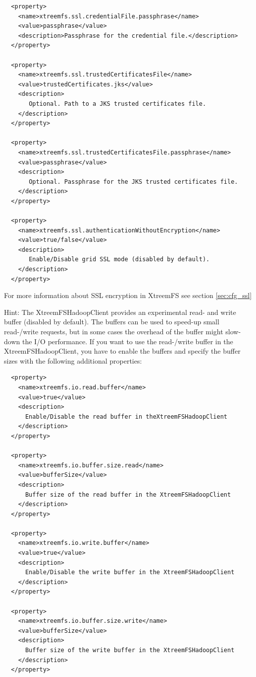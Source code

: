 \documentclass[a4paper,10pt]{book}
\begin{document}
\begin{enumerate}
\begin{enumerate}
\begin{verbatim}
  <property>
    <name>xtreemfs.ssl.credentialFile.passphrase</name>
    <value>passphrase</value>
    <description>Passphrase for the credential file.</description>
  </property>

  <property>
    <name>xtreemfs.ssl.trustedCertificatesFile</name>
    <value>trustedCertificates.jks</value>
    <description>
       Optional. Path to a JKS trusted certificates file.
    </description>
  </property>

  <property>
    <name>xtreemfs.ssl.trustedCertificatesFile.passphrase</name>
    <value>passphrase</value>
    <description>
       Optional. Passphrase for the JKS trusted certificates file.
    </description>
  </property>

  <property>
    <name>xtreemfs.ssl.authenticationWithoutEncryption</name>
    <value>true/false</value>
    <description>
       Enable/Disable grid SSL mode (disabled by default).
    </description>
  </property>
	\end{verbatim}

  For more information about SSL encryption in XtreemFS see section \ref{sec:cfg_ssl}

	Hint: The XtreemFSHadoopClient provides an experimental read- and write buffer (disabled by default). The buffers can be used to speed-up small read-/write requests, but in some cases the overhead of the buffer might slow-down the I/O performance. If you want to use the read-/write buffer in the XtreemFSHadoopClient, you have to enable the buffers and specify the buffer sizes with the following additional properties:
	\begin{verbatim}
  <property>
    <name>xtreemfs.io.read.buffer</name>
    <value>true</value>
    <description>
      Enable/Disable the read buffer in theXtreemFSHadoopClient
    </description>
  </property>
  
  <property>
    <name>xtreemfs.io.buffer.size.read</name>
    <value>bufferSize</value>
    <description>
      Buffer size of the read buffer in the XtreemFSHadoopClient
    </description>
  </property>
  
  <property>
    <name>xtreemfs.io.write.buffer</name>
    <value>true</value>
    <description>
      Enable/Disable the write buffer in the XtreemFSHadoopClient
    </description>
  </property>
  
  <property>
    <name>xtreemfs.io.buffer.size.write</name>
    <value>bufferSize</value>
    <description>
      Buffer size of the write buffer in the XtreemFSHadoopClient
    </description>
  </property>	
	\end{verbatim}	
	\end{enumerate}


\end{enumerate}
\end{document}
